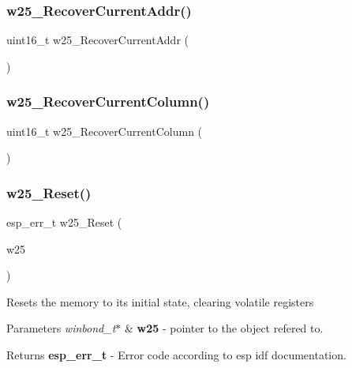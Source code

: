 \subsubsection{w25\+\_\+\+Recover\+Current\+Addr()}
{\footnotesize\ttfamily uint16\+\_\+t w25\+\_\+\+Recover\+Current\+Addr (\begin{DoxyParamCaption}\item[{void}]{ }\end{DoxyParamCaption})}

\mbox{\label{_w25_n01_g_v_8h_a478298d3c97a0fc6726c4aa9ad137a22}} 
\subsubsection{w25\+\_\+\+Recover\+Current\+Column()}
{\footnotesize\ttfamily uint16\+\_\+t w25\+\_\+\+Recover\+Current\+Column (\begin{DoxyParamCaption}\item[{void}]{ }\end{DoxyParamCaption})}

\mbox{\label{_w25_n01_g_v_8h_aab81a62c7f4963ff64c93261136d63b7}} 
\subsubsection{w25\+\_\+\+Reset()}
{\footnotesize\ttfamily esp\+\_\+err\+\_\+t w25\+\_\+\+Reset (\begin{DoxyParamCaption}\item[{const \textbf{ winbond\+\_\+t} $\ast$}]{w25 }\end{DoxyParamCaption})}

Resets the memory to its initial state, clearing volatile registers 
\begin{DoxyParams}{Parameters}
{\em winbond\+\_\+t$\ast$} & {\bfseries w25} -\/ pointer to the object refered to. \\
\hline
\end{DoxyParams}
\begin{DoxyReturn}{Returns}
{\bfseries esp\+\_\+err\+\_\+t} -\/ Error code according to esp idf documentation. 
\end{DoxyReturn}
\mbox{\label{_w25_n01_g_v_8h_a290abd3b2d5aabe87ceb0cc101f0fcf9}} 

